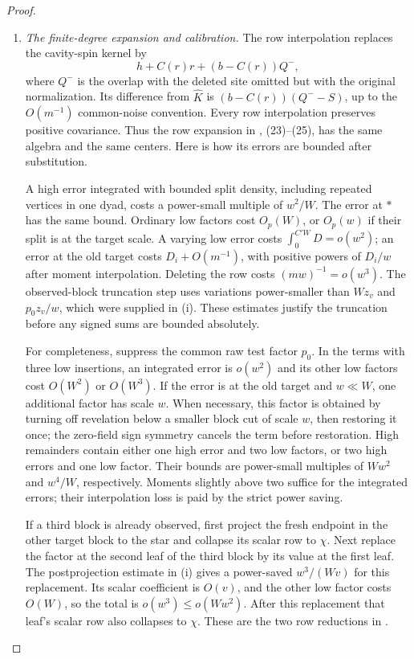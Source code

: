 \begin{proof}
\begin{enumerate}[label=(\roman*)]
\item \emph{The finite-degree expansion and calibration.}
The row interpolation replaces the cavity-spin kernel by
\[
 h+C(r)r+(b-C(r))Q^{-},
\]
where \(Q^{-}\) is the overlap with the deleted site omitted but with
the original normalization. Its difference from \(\widehat K\)
is \((b-C(r))(Q^{-}-S)\), up to the \(O(m^{-1})\) common-noise
convention. Every row interpolation preserves positive covariance.
Thus the row expansion in \cite[Lemmas~4.5, 4.7 and 4.8]{PE},
(23)--(25), has the same algebra and the same centers.
Here is how its errors are bounded after substitution.

A high error integrated with bounded split density, including repeated
vertices in one dyad, costs a power-small multiple of \(w^2/W\).
The error at \(*\) has the same bound. Ordinary low factors cost
\(O_p(W)\), or \(O_p(w)\) if their split is at the target scale.
A varying low error costs \(\int_0^{C'W}D=o(w^2)\); an error
at the old target costs \(D_i+O(m^{-1})\), with positive powers of
\(D_i/w\) after moment interpolation. Deleting the row costs
\((mw)^{-1}=o(w^3)\). The observed-block truncation step uses
variations power-smaller than \(Wz_v\) and \(p_0z_v/w\), which
were supplied in (i). These estimates justify the truncation before
any signed sums are bounded absolutely.

For completeness, suppress the common raw test factor \(p_0\).
In the terms with three low insertions, an integrated error is
\(o(w^2)\) and its other low factors cost \(O(W^2)\) or
\(O(W^3)\). If the error is at the old target and \(w\ll W\),
one additional factor has scale \(w\). When necessary, this factor
is obtained by turning off revelation below a smaller block cut of
scale \(w\), then restoring it once; the zero-field sign symmetry
cancels the term before restoration. High remainders contain either
one high error and two low factors, or two high errors and one low
factor. Their bounds are power-small multiples of \(Ww^2\) and
\(w^4/W\), respectively. Moments slightly above two suffice for
the integrated errors; their interpolation loss is paid by the strict
power saving.

If a third block is already observed, first project the fresh endpoint
in the other target block to the star and collapse its scalar row to
\(\chi\). Next replace the factor at the second leaf of the third
block by its value at the first leaf. The postprojection estimate in
(i) gives a power-saved \(w^3/(Wv)\) for this replacement. Its
scalar coefficient is \(O(v)\), and the other low factor costs
\(O(W)\), so the total is \(o(w^3)\le o(Ww^2)\). After this
replacement that leaf's
scalar row also collapses to \(\chi\). These are the two row
reductions in \cite[Lemma~4.7, observed-third-block case]{PE}.


\end{enumerate}
\end{proof}
